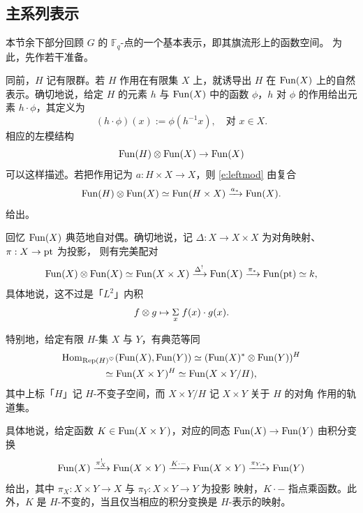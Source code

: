 
\subsection{主系列表示}

\ssszh 本节余下部分回顾 $G$ 的 $\mathbb{F}_q$-点的一个基本表示，即其旗流形上的函数空间。
为此，先作若干准备。

\ssszh  \label{ex:actspace}同前，$H$ 记有限群。若 $H$ 作用在有限集 $X$ 上，就诱导出
$H$ 在 $\operatorname{Fun}(X)$ 上的自然表示。确切地说，给定 $H$ 的元素 $h$ 与 $\operatorname{Fun}(X)$ 中的函数
$\phi$，$h$ 对 $\phi$ 的作用给出元素 $h \cdot \phi$，其定义为
%
\[
(h \cdot \phi)(x) := \phi(h^{-1} x), \quad \text{对 } x \in X.
\]
%
相应的左模结构
%
\begin{equation} \label{e:leftmod}
\operatorname{Fun}(H) \otimes \operatorname{Fun}(X) \rightarrow \operatorname{Fun}(X)
\end{equation}
%
可以这样描述。若把作用记为 $a: H \times X \rightarrow X$，则 \eqref{e:leftmod} 由复合
%
\begin{equation} \label{e:actionfun}
\operatorname{Fun}(H) \otimes \operatorname{Fun}(X) \simeq \operatorname{Fun}(H \times X) \xrightarrow{a_*} \operatorname{Fun}(X).
\end{equation}
%
给出。

\ssszh\label{s:funselfdual} 回忆 $\operatorname{Fun}(X)$ 典范地自对偶。确切地说，记
$\Delta: X \rightarrow X \times X$ 为对角映射、$\pi: X \rightarrow \operatorname{pt}$ 为投影，
则有完美配对
%
\[
\operatorname{Fun}(X) \otimes \operatorname{Fun}(X) \simeq \operatorname{Fun}(X \times X) \xrightarrow{\Delta^!}
\operatorname{Fun}(X) \xrightarrow{\pi_*} \operatorname{Fun}(\operatorname{pt}) \simeq k,
\]
%
具体地说，这不过是「$L^2$」内积
%
\[
f \otimes g \mapsto \underset{x}{\Sigma} \hspace{1mm} f(x) \cdot g(x).
\]
%

\ssszh \label{sss:endos}

特别地，给定有限 $H$-集 $X$ 与 $Y$，有典范等同
%
\[
\begin{gathered}
\operatorname{Hom}_{\operatorname{Rep}(H)^\heartsuit}( \operatorname{Fun}(X), \operatorname{Fun}(Y)) \simeq ( \operatorname{Fun}(X)^* \otimes
\operatorname{Fun}(Y))^{H} \\
\simeq \operatorname{Fun}(X \times Y)^H \simeq \operatorname{Fun}(X \times Y/ H),
\end{gathered}
\]
%
其中上标「$H$」记 $H$-不变子空间，而 $X \times Y / H$ 记 $X \times Y$ 关于 $H$ 的对角
作用的轨道集。

具体地说，给定函数 $K \in \operatorname{Fun}(X \times Y)$，对应的同态 $\operatorname{Fun}(X) \rightarrow \operatorname{Fun}(Y)$
由积分变换
%
\[
   \operatorname{Fun}(X) \xrightarrow{\pi_X^!} \operatorname{Fun}(X \times Y) \xrightarrow{ K \cdot - } \operatorname{Fun}(X \times Y) \xrightarrow{\pi_{Y, *}} \operatorname{Fun}(Y)
\]
%
给出，其中 $\pi_X: X \times Y \rightarrow X$ 与 $\pi_Y: X \times Y \rightarrow Y$ 为投影
映射，$K \cdot -$ 指点乘函数。此外，$K$ 是 $H$-不变的，当且仅当相应的积分变换是
$H$-表示的映射。

